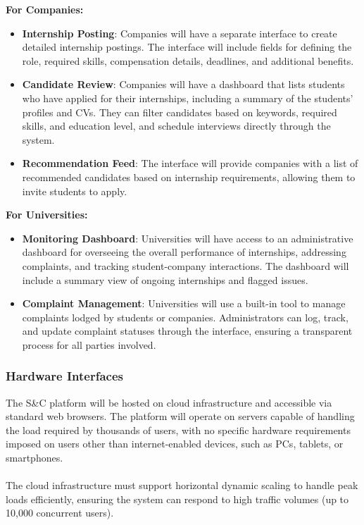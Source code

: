\textbf{For Companies:}
\begin{itemize}
    \item \textbf{Internship Posting}: Companies will have a separate interface to create detailed internship postings. The interface will include fields for defining the role, required skills, compensation details, deadlines, and additional benefits.
    \item \textbf{Candidate Review}: Companies will have a dashboard that lists students who have applied for their internships, including a summary of the students' profiles and CVs. They can filter candidates based on keywords, required skills, and education level, and schedule interviews directly through the system. 
    \item \textbf{Recommendation Feed}: The interface will provide companies with a list of recommended candidates based on internship requirements, allowing them to invite students to apply.
\end{itemize} 
\vspace{5mm}
\textbf{For Universities:}
\begin{itemize}
    \item \textbf{Monitoring Dashboard}: Universities will have access to an administrative dashboard for overseeing the overall performance of internships, addressing complaints, and tracking student-company interactions. The dashboard will include a summary view of ongoing internships and flagged issues.
    \item \textbf{Complaint Management}: Universities will use a built-in tool to manage complaints lodged by students or companies. Administrators can log, track, and update complaint statuses through the interface, ensuring a transparent process for all parties involved.
\end{itemize}

\subsubsection{Hardware Interfaces}

The S\&C platform will be hosted on cloud infrastructure and accessible via standard web browsers. The platform will operate on servers capable of handling the load required by thousands of users, with no specific hardware requirements imposed on users other than internet-enabled devices, such as PCs, tablets, or smartphones.\\ \\
The cloud infrastructure must support horizontal dynamic scaling to handle peak loads efficiently, ensuring the system can respond to high traffic volumes (up to 10,000 concurrent users).

